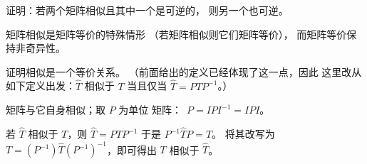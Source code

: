 \begin{exercises}
\begin{answer}
    \end{answer}
  \recommended \item
    证明：若两个矩阵相似且其中一个是可逆的，
    则另一个也可逆。
    \begin{answer}
       矩阵相似是矩阵等价的特殊情形 
       （若矩阵相似则它们矩阵等价），
       而矩阵等价保持非奇异性。
    \end{answer}
  \item \label{exer:SimIsEquivRel}
    证明相似是一个等价关系。
    （前面给出的定义已经体现了这一点，因此 
    这里改从如下定义出发：$\hat{T}$ 相似于
    $T$ 当且仅当 $\hat{T}=PTP^{-1}$。）
    \begin{answer}
       矩阵与它自身相似；取 \( P \) 为单位
       矩阵：~$P=IPI^{-1}=IPI$。

       若 \( \hat{T} \) 相似于 \( T \)，则 \( \hat{T}=PTP^{-1} \)
       于是 \( P^{-1}\hat{T}P=T \)。
       将其改写为 \( T=(P^{-1})\hat{T}(P^{-1})^{-1} \)，即可得出
       $T$ 相似于 \( \hat{T} \)。


\end{answer}
\end{exercises}
